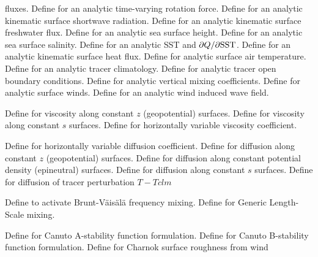 \begin{klist}
\begin{klist}
  fluxes.
      Define for an analytic time-varying rotation
  force.
      Define for an analytic kinematic surface
  shortwave radiation.
      Define for an analytic kinematic surface
  freshwater flux.
      Define for an analytic sea surface height.
      Define for an analytic sea surface salinity.
      Define for an analytic SST and
  $\partial Q /\partial {\rm SST}$.
      Define for an analytic kinematic surface
  heat flux.
        Define for analytic surface air temperature.
      Define for an analytic tracer climatology.
       Define for analytic tracer open boundary
  conditions.
        Define for analytic vertical mixing
  coefficients.
       Define for analytic surface winds.
       Define for an analytic wind induced wave
  field.
  \end{klist}
   \mbox{}
  \begin{klist}
       Define for viscosity along constant $z$
   (geopotential) surfaces.
       Define for viscosity along constant $s$
   surfaces.
        Define for horizontally variable viscosity
     coefficient.
  \end{klist}
   \mbox{}
  \begin{klist}
        Define for horizontally variable diffusion
     coefficient.
       Define for diffusion along constant $z$
   (geopotential) surfaces.
       Define for diffusion along constant potential
   density (epineutral) surfaces.
       Define for diffusion along constant $s$
   surfaces.
       Define for diffusion of tracer perturbation
     $T-Tclm$
  \end{klist}
   \mbox{}
  \begin{klist}
       Define to activate Brunt-V\"ais\"al\"a
   frequency mixing.
       Define for Generic Length-Scale mixing.
    \begin{klist}
         Define for Canuto A-stability function
       formulation.
         Define for Canuto B-stability function
       formulation.
         Define for Charnok surface roughness from wind

\end{klist}
\end{klist}
\end{klist}
